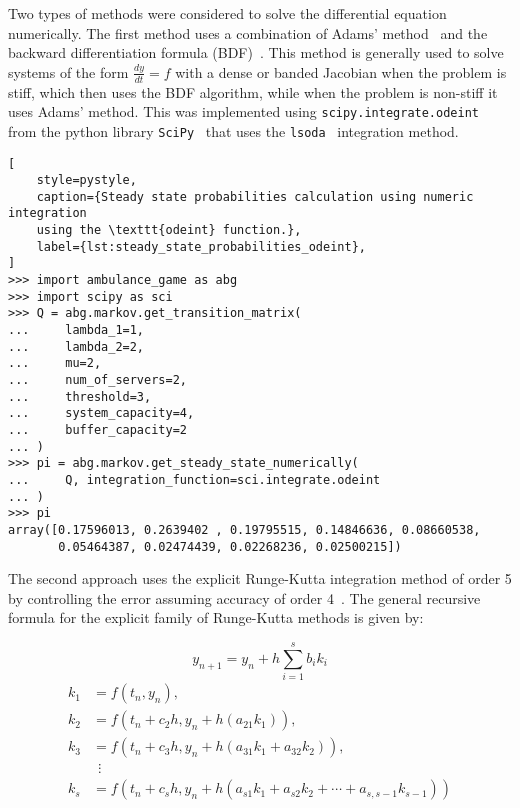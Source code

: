 Two types of methods were considered to solve the differential equation
numerically.
The first method uses a combination of Adams' method~\cite{adams_method} and the
backward differentiation formula (BDF)~\cite{backward_differentiation_formula}.
This method is generally used to solve systems of the form
\(\frac{dy}{dt} = f\) with a dense or banded Jacobian when the problem is stiff,
which then uses the BDF algorithm, while when the problem is non-stiff it uses
Adams' method.
This was implemented using \texttt{scipy.integrate.odeint} from the python
library \texttt{SciPy}~\cite{2020SciPy-NMeth} that uses the
\texttt{lsoda}~\cite{lsoda_algorithm} integration method.

\begin{lstlisting}[
    style=pystyle,
    caption={Steady state probabilities calculation using numeric integration
    using the \texttt{odeint} function.},
    label={lst:steady_state_probabilities_odeint},
]
>>> import ambulance_game as abg
>>> import scipy as sci
>>> Q = abg.markov.get_transition_matrix(
...     lambda_1=1,
...     lambda_2=2,
...     mu=2,
...     num_of_servers=2,
...     threshold=3,
...     system_capacity=4,
...     buffer_capacity=2
... )
>>> pi = abg.markov.get_steady_state_numerically(
...     Q, integration_function=sci.integrate.odeint
... )
>>> pi
array([0.17596013, 0.2639402 , 0.19795515, 0.14846636, 0.08660538,
       0.05464387, 0.02474439, 0.02268236, 0.02500215])

\end{lstlisting}



The second approach uses the explicit Runge-Kutta integration method of order 5
by controlling the error assuming accuracy of order
4~\cite{solve_ivp_rk45_method, runge_kutta_formulas}.
The general recursive formula for the explicit family of Runge-Kutta methods is
given by:

\begin{equation}
    y_{n+1} = y_n + h \sum_{i=1}^s b_i k_i
\end{equation}
\begin{align}
    k_1 & = f(t_n, y_n), \nonumber \\
    k_2 & = f(t_n+c_2h, y_n+h(a_{21}k_1)), \nonumber \\
    k_3 & = f(t_n+c_3h, y_n+h(a_{31}k_1+a_{32}k_2)), \nonumber \\
        & \ \ \vdots \nonumber \\
    k_s & = f(t_n+c_s h, y_n+h(a_{s1}k_1+a_{s2}k_2+\cdots+a_{s,s-1}k_{s-1}))
    \nonumber
\end{align}

